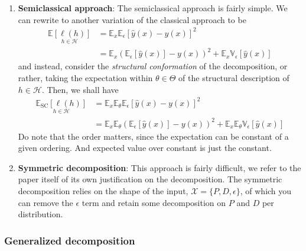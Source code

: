 \documentclass[
  journal=largetwo,
  year=2025,
  volume=37,
]{cup-journal}
\begin{document}
\begin{enumerate}
    \item \textbf{Semiclassical approach}: The semiclassical approach is fairly simple. We can rewrite to another variation of the classical approach to be \begin{equation}
        \begin{split}
            \underset{h\in\mathcal{H}}{\mathbb{E}[\ell(h)]} &= \mathbb{E}_{x}\mathbb{E}_{\epsilon}\left[\hat{y}(x)-y(x)\right]^{2}\\
             &= \mathbb{E}_{x}\left(\mathbb{E}_{\epsilon}[\hat{y}(x)]-y(x)\right)^{2} + \mathbb{E}_{x}\mathbb{V}_{\epsilon}\left[\hat{y}(x)\right]  
        \end{split}
    \end{equation}
    and instead, consider the \textit{structural conformation} of the decomposition, or rather, taking the expectation within $\theta\in \Theta$ of the structural description of $h\in\mathcal{H}$. Then, we shall have 
    \begin{equation}
        \begin{split}
            \underset{h\in\mathcal{H}}{\mathbb{E}_{\mathrm{SC}}[\ell(h)]} 
            &= \mathbb{E}_{x}\mathbb{E}_{\theta}\mathbb{E}_{\epsilon}\left[\hat{y}(x)-y(x)\right]^{2} \\
            &= \mathbb{E}_{x}\mathbb{E}_{\theta}\left(\mathbb{E}_{\epsilon}[\hat{y}(x)]-y(x)\right)^{2} + \mathbb{E}_{x}\mathbb{E}_{\theta}\mathbb{V}_{\epsilon}\left[\hat{y}(x)\right]
        \end{split}
    \end{equation}
    Do note that the order matters, since the expectation can be constant of a given ordering. And expected value over constant is just the constant. 
    \item \textbf{Symmetric decomposition}: This approach is fairly difficult, we refer to the paper itself of its own justification on the decomposition. The symmetric decomposition relies on the shape of the input, $\mathcal{X}=\{P,D,\epsilon\}$, of which you can remove the $\epsilon$ term and retain some decomposition on $P$ and $D$ per distribution. 
\end{enumerate}

\subsubsection{Generalized decomposition}
\end{document}
